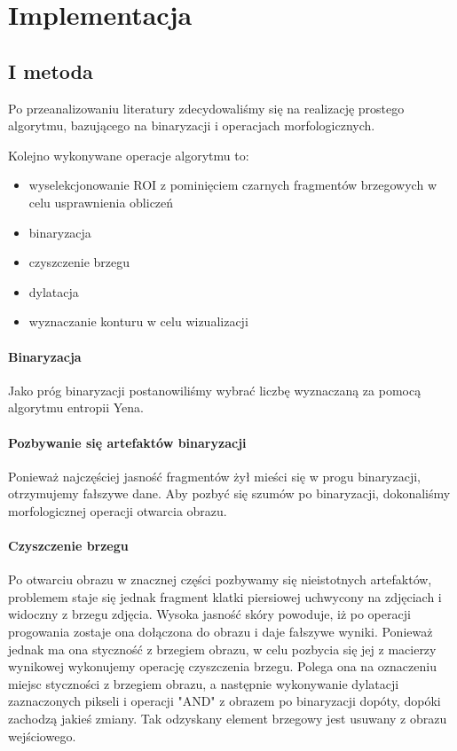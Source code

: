 \documentclass[11pt,openany]{sprawozdanie-agh}
\begin{document}
\section{Implementacja}
\subsection{I metoda}
Po przeanalizowaniu literatury zdecydowaliśmy się na realizację prostego algorytmu, bazującego na binaryzacji i operacjach morfologicznych.

Kolejno wykonywane operacje algorytmu to:
\begin{itemize}
\item wyselekcjonowanie ROI z pominięciem czarnych fragmentów brzegowych w celu usprawnienia obliczeń
\item binaryzacja
\item czyszczenie brzegu
\item dylatacja
\item wyznaczanie konturu w celu wizualizacji
\end{itemize}

\paragraph{Binaryzacja\\}
Jako próg binaryzacji postanowiliśmy wybrać liczbę wyznaczaną za pomocą algorytmu entropii Yena.

\paragraph{Pozbywanie się artefaktów binaryzacji\\}
Ponieważ najczęściej jasność fragmentów żył mieści się w progu binaryzacji, otrzymujemy fałszywe dane. Aby pozbyć się szumów po binaryzacji, dokonaliśmy morfologicznej operacji otwarcia obrazu.

\paragraph{Czyszczenie brzegu\\}
Po otwarciu obrazu w znacznej części pozbywamy się nieistotnych artefaktów, problemem staje się jednak fragment klatki piersiowej uchwycony na zdjęciach i widoczny z brzegu zdjęcia. Wysoka jasność skóry powoduje, iż po operacji progowania zostaje ona dołączona do obrazu i daje fałszywe wyniki. Ponieważ jednak ma ona styczność z brzegiem obrazu, w celu pozbycia się jej z macierzy wynikowej wykonujemy operację czyszczenia brzegu.
Polega ona na oznaczeniu miejsc styczności z brzegiem obrazu, a następnie wykonywanie dylatacji zaznaczonych pikseli i operacji "AND" z obrazem po binaryzacji dopóty, dopóki zachodzą jakieś zmiany. Tak odzyskany element brzegowy jest usuwany z obrazu wejściowego.
\end{document}
